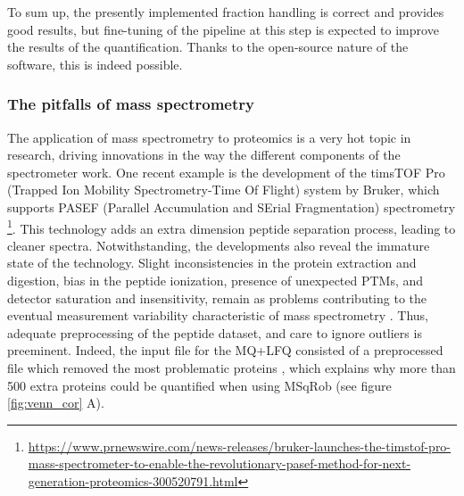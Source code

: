 To sum up, the presently implemented fraction handling is correct and provides good results, but fine-tuning of the pipeline at this step is expected to improve the results of the quantification. Thanks to the open-source nature of the software, this is indeed possible.


%
%
%
%
%


\subsubsection{The pitfalls of mass spectrometry}

The application of mass spectrometry to proteomics is a very hot topic in research, driving innovations in the way the different components of the spectrometer work. One recent example is the development of the timsTOF\texttrademark\xspace Pro (Trapped Ion Mobility Spectrometry-Time Of Flight) system by Bruker, which supports PASEF (Parallel Accumulation and SErial Fragmentation) spectrometry \footnote{\href{https://www.prnewswire.com/news-releases/bruker-launches-the-timstof-pro-mass-spectrometer-to-enable-the-revolutionary-pasef-method-for-next-generation-proteomics-300520791.html}{https://www.prnewswire.com/news-releases/bruker-launches-the-timstof-pro-mass-spectrometer-to-enable-the-revolutionary-pasef-method-for-next-generation-proteomics-300520791.html}}. This technology adds  an extra dimension peptide separation process, leading to cleaner spectra.
Notwithstanding, the developments also reveal the immature state of the technology. Slight inconsistencies in the protein extraction and digestion, bias in the peptide ionization, presence of unexpected PTMs, and detector saturation and insensitivity, remain as problems contributing to the eventual measurement variability characteristic of mass spectrometry \cite{Piehowski2013}. Thus, adequate preprocessing of the peptide dataset, and care to ignore outliers is preeminent. Indeed, the input file for the MQ+LFQ consisted of a preprocessed file which removed the most problematic proteins \cite{Cox2014}, which explains why more than 500 extra proteins could be quantified when using MSqRob (see figure \ref{fig:venn_cor} A).

